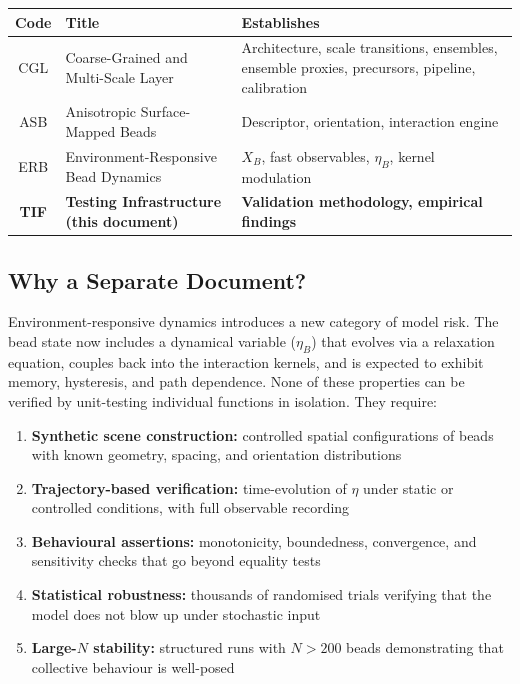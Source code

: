 \documentclass[11pt]{article}
\begin{document}
\begin{center}
\begin{tabular}{cll}
    \textbf{Code} & \textbf{Title} & \textbf{Establishes} \\
    \midrule
    CGL & Coarse-Grained and Multi-Scale Layer
        & Architecture, scale transitions, ensembles,
          ensemble proxies, precursors, pipeline, calibration \\
    ASB & Anisotropic Surface-Mapped Beads
        & Descriptor, orientation, interaction engine \\
    ERB & Environment-Responsive Bead Dynamics
        & $X_B$, fast observables, $\eta_B$, kernel modulation \\
    \textbf{TIF} & \textbf{Testing Infrastructure (this document)}
        & \textbf{Validation methodology, empirical findings} \\
\end{tabular}
\end{center}

\subsection{Why a Separate Document?}

Environment-responsive dynamics introduces a new category of model risk.
The bead state now includes a dynamical variable ($\eta_B$) that evolves
via a relaxation equation, couples back into the interaction kernels, and
is expected to exhibit memory, hysteresis, and path dependence.  None of
these properties can be verified by unit-testing individual functions in
isolation.  They require:

\begin{enumerate}
    \item \textbf{Synthetic scene construction:} controlled spatial
          configurations of beads with known geometry, spacing, and
          orientation distributions
    \item \textbf{Trajectory-based verification:} time-evolution of $\eta$
          under static or controlled conditions, with full observable
          recording
    \item \textbf{Behavioural assertions:} monotonicity, boundedness,
          convergence, and sensitivity checks that go beyond equality tests
    \item \textbf{Statistical robustness:} thousands of randomised trials
          verifying that the model does not blow up under stochastic input
    \item \textbf{Large-$N$ stability:} structured runs with $N > 200$
          beads demonstrating that collective behaviour is well-posed
\end{enumerate}
\end{document}
